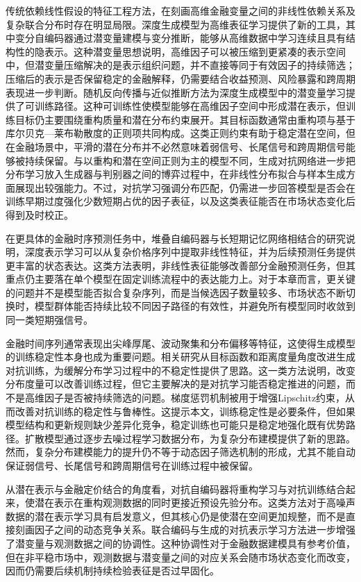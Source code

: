 传统依赖线性假设的特征工程方法，在刻画高维金融变量之间的非线性依赖关系及复杂联合分布时存在明显局限。深度生成模型为高维表征学习提供了新的工具，其中变分自编码器通过潜变量建模与变分推断，能够从高维数据中学习连续且具有结构性的隐表示\cite{kingma2014autoencoding}。这种潜变量思想说明，高维因子可以被压缩到更紧凑的表示空间中，但潜变量压缩解决的是表示组织问题，并不直接等同于有效因子的持续筛选；压缩后的表示是否保留稳定的金融解释，仍需要结合收益预测、风险暴露和跨周期表现进一步判断。随机反向传播与近似推断方法为深度生成模型中的潜变量学习提供了可训练路径\cite{rezende2014stochastic}。这种可训练性使模型能够在高维因子空间中形成潜在表示，但训练目标仍主要围绕重构质量和潜在分布约束展开。其目标函数通常由重构项与基于库尔贝克—莱布勒散度的正则项共同构成\cite{kullback1951information}。这类正则约束有助于稳定潜在空间，但在金融场景中，平滑的潜在分布并不必然意味着弱信号、长尾信号和跨周期信号能够被持续保留。与以重构和潜在空间正则为主的模型不同，生成对抗网络进一步把分布学习放入生成器与判别器之间的博弈过程中，在非线性分布拟合与样本生成方面展现出较强能力\cite{goodfellow2014generative}。不过，对抗学习强调分布匹配，仍需进一步回答模型是否会在训练早期过度强化少数短期占优的因子表征，以及这类表征能否在市场状态变化后得到及时校正。

在更具体的金融时序预测任务中，堆叠自编码器与长短期记忆网络相结合的研究说明，深度表示学习可以从复杂价格序列中提取非线性特征，并为后续预测任务提供更丰富的状态表达\cite{ding2020deep}。这类方法表明，非线性表征能够改善部分金融预测任务，但其重点仍主要落在单个模型在固定训练流程中的表达能力上。对于本章而言，更关键的问题并不是模型能否拟合复杂序列，而是当候选因子数量较多、市场状态不断切换时，模型群体能否持续比较不同因子路径的有效性，并避免所有模型同时收敛到同一类短期强信号。

金融时间序列通常表现出尖峰厚尾、波动聚集和分布偏移等特征，这使得生成模型的训练稳定性本身也成为重要问题。相关研究从目标函数和距离度量角度改进生成对抗训练，为缓解分布学习过程中的不稳定性提供了思路\cite{arjovsky2017towards}。这一类方法说明，改变分布度量可以改善训练过程，但它主要解决的是对抗学习能否稳定推进的问题，而不是高维因子是否被持续筛选的问题。梯度惩罚机制被用于增强Lipschitz约束，从而改善对抗训练的稳定性与鲁棒性\cite{gulrajani2017improved}。这提示本文，训练稳定性是必要条件，但如果模型结构和更新规则缺少差异化竞争，稳定训练也可能只是稳定地强化既有优势路径。扩散模型通过逐步去噪过程学习数据分布，为复杂分布建模提供了新的思路\cite{ho2020denoising}。然而，复杂分布建模能力的提升仍不等于动态因子筛选机制的形成，尤其不能自动保证弱信号、长尾信号和跨周期信号在训练过程中被保留。

从潜在表示与金融定价结合的角度看，对抗自编码器将重构学习与对抗训练结合起来，使潜在表示在重构观测数据的同时更接近预设先验分布\cite{makhzani2015adversarial}。这类方法对于高噪声数据的潜在表示学习具有启发意义，但其核心仍是使潜在空间更加规整，而不是直接刻画因子之间的动态竞争关系。联合编码与生成的对抗表示学习方法进一步增强了潜变量与观测数据之间的协调性\cite{donahue2017adversarial}。这种协调性对于金融数据建模具有参考价值，但在非平稳市场中，观测数据与潜变量之间的对应关系会随市场状态变化而改变，因而仍需要后续机制持续检验表征是否过早固化。

